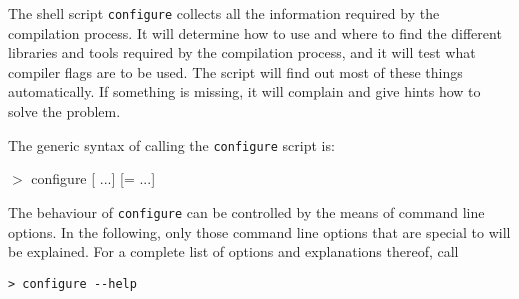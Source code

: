 The shell script \texttt{configure} collects all the information
required by the compilation process. It will determine how to use and
where to find the different libraries and tools required by the
compilation process, and it will test what compiler flags are to be
used.  The script will find out most of these things automatically.
If something is missing, it will complain and give hints how to solve
the problem.

The generic syntax of calling the \texttt{configure} script is:
\begin{code}
 $>$ configure [ ...] [= ...]
\end{code}

The behaviour of \texttt{configure} can be controlled by the means of
command line options. In the following, only those command line
options that are special to \es{} will be explained.  For a complete
list of options and explanations thereof, call
\begin{verbatim}
> configure --help
\end{verbatim}

